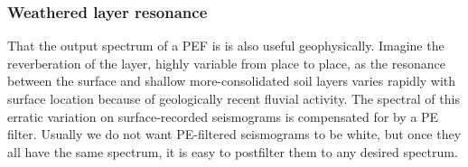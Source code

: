 \subsubsection{Weathered layer resonance}
\par
That the output spectrum of a PEF is  is also
useful geophysically.
Imagine the reverberation of the  layer,
highly variable from place to place,
as the resonance between the surface and shallow
more-consolidated soil layers
varies rapidly with surface location
because
of geologically recent fluvial activity.
The spectral  of this erratic variation on surface-recorded
seismograms is compensated for by a PE filter.
Usually we do not want PE-filtered seismograms to be white,
but once they all have the same spectrum,
it is easy to postfilter them to any desired spectrum.




